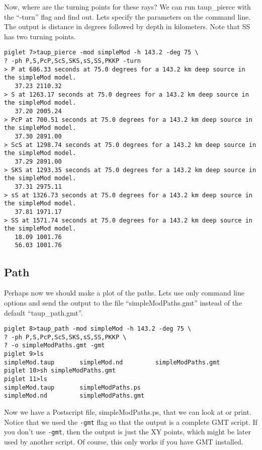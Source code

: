 Now, where are the turning points for these rays? We can run taup\_pierce with
the ``-turn'' flag and
find out. Lets specify the parameters on the command line.
The output is distance in degrees followed by depth in kilometers. 
Note that SS has two turning points. 

\begin{verbatim}
piglet 7>taup_pierce -mod simpleMod -h 143.2 -deg 75 \
? -ph P,S,PcP,ScS,SKS,sS,SS,PKKP -turn
> P at 686.33 seconds at 75.0 degrees for a 143.2 km deep source in the simpleMod model.
   37.23 2110.32
> S at 1263.17 seconds at 75.0 degrees for a 143.2 km deep source in the simpleMod model.
   37.20 2005.24
> PcP at 700.51 seconds at 75.0 degrees for a 143.2 km deep source in the simpleMod model.
   37.30 2891.00
> ScS at 1298.74 seconds at 75.0 degrees for a 143.2 km deep source in the simpleMod model.
   37.29 2891.00
> SKS at 1293.35 seconds at 75.0 degrees for a 143.2 km deep source in the simpleMod model.
   37.31 2975.11
> sS at 1326.73 seconds at 75.0 degrees for a 143.2 km deep source in the simpleMod model.
   37.81 1971.17
> SS at 1571.74 seconds at 75.0 degrees for a 143.2 km deep source in the simpleMod model.
   18.09 1001.76
   56.03 1001.76
\end{verbatim}

\subsection{Path}

Perhaps now we should make a plot of the
paths. Lets use only command line options and send the output to the file 
``simpleModPaths.gmt'' instead of the default ``taup\_path.gmt''.

\begin{verbatim}
piglet 8>taup_path -mod simpleMod -h 143.2 -deg 75 \
? -ph P,S,PcP,ScS,SKS,sS,SS,PKKP \
? -o simpleModPaths.gmt -gmt
piglet 9>ls
simpleMod.taup       simpleMod.nd         simpleModPaths.gmt
piglet 10>sh simpleModPaths.gmt
piglet 11>ls
simpleMod.taup       simpleModPaths.ps
simpleMod.nd         simpleModPaths.gmt
\end{verbatim}

Now we have a Postscript file, simpleModPaths.ps, that we can look at or print.
Notice that we used the \texttt{-gmt} flag so that the output is a complete 
GMT script. If you don't use \texttt{-gmt}, then the output is just the XY 
points, which might be later used by another script.
Of course, this only works if you have GMT installed.


